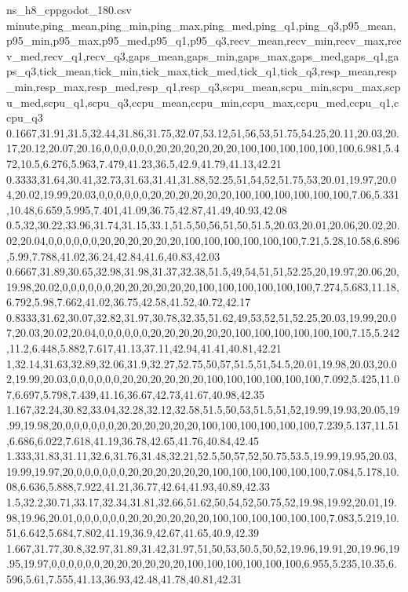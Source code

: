 \begin{filecontents*}[overwrite]{ns_h8_cppgodot_180.csv}
minute,ping_mean,ping_min,ping_max,ping_med,ping_q1,ping_q3,p95_mean,p95_min,p95_max,p95_med,p95_q1,p95_q3,recv_mean,recv_min,recv_max,recv_med,recv_q1,recv_q3,gaps_mean,gaps_min,gaps_max,gaps_med,gaps_q1,gaps_q3,tick_mean,tick_min,tick_max,tick_med,tick_q1,tick_q3,resp_mean,resp_min,resp_max,resp_med,resp_q1,resp_q3,scpu_mean,scpu_min,scpu_max,scpu_med,scpu_q1,scpu_q3,ccpu_mean,ccpu_min,ccpu_max,ccpu_med,ccpu_q1,ccpu_q3
0.1667,31.91,31.5,32.44,31.86,31.75,32.07,53.12,51,56,53,51.75,54.25,20.11,20.03,20.17,20.12,20.07,20.16,0,0,0,0,0,0,20,20,20,20,20,20,100,100,100,100,100,100,6.981,5.472,10.5,6.276,5.963,7.479,41.23,36.5,42.9,41.79,41.13,42.21
0.3333,31.64,30.41,32.73,31.63,31.41,31.88,52.25,51,54,52,51.75,53,20.01,19.97,20.04,20.02,19.99,20.03,0,0,0,0,0,0,20,20,20,20,20,20,100,100,100,100,100,100,7.06,5.331,10.48,6.659,5.995,7.401,41.09,36.75,42.87,41.49,40.93,42.08
0.5,32,30.22,33.96,31.74,31.15,33.1,51.5,50,56,51,50,51.5,20.03,20.01,20.06,20.02,20.02,20.04,0,0,0,0,0,0,20,20,20,20,20,20,100,100,100,100,100,100,7.21,5.28,10.58,6.896,5.99,7.788,41.02,36.24,42.84,41.6,40.83,42.03
0.6667,31.89,30.65,32.98,31.98,31.37,32.38,51.5,49,54,51,51,52.25,20,19.97,20.06,20,19.98,20.02,0,0,0,0,0,0,20,20,20,20,20,20,100,100,100,100,100,100,7.274,5.683,11.18,6.792,5.98,7.662,41.02,36.75,42.58,41.52,40.72,42.17
0.8333,31.62,30.07,32.82,31.97,30.78,32.35,51.62,49,53,52,51,52.25,20.03,19.99,20.07,20.03,20.02,20.04,0,0,0,0,0,0,20,20,20,20,20,20,100,100,100,100,100,100,7.15,5.242,11.2,6.448,5.882,7.617,41.13,37.11,42.94,41.41,40.81,42.21
1,32.14,31.63,32.89,32.06,31.9,32.27,52.75,50,57,51.5,51,54.5,20.01,19.98,20.03,20.02,19.99,20.03,0,0,0,0,0,0,20,20,20,20,20,20,100,100,100,100,100,100,7.092,5.425,11.07,6.697,5.798,7.439,41.16,36.67,42.73,41.67,40.98,42.35
1.167,32.24,30.82,33.04,32.28,32.12,32.58,51.5,50,53,51.5,51,52,19.99,19.93,20.05,19.99,19.98,20,0,0,0,0,0,0,20,20,20,20,20,20,100,100,100,100,100,100,7.239,5.137,11.51,6.686,6.022,7.618,41.19,36.78,42.65,41.76,40.84,42.45
1.333,31.83,31.11,32.6,31.76,31.48,32.21,52.5,50,57,52,50.75,53.5,19.99,19.95,20.03,19.99,19.97,20,0,0,0,0,0,0,20,20,20,20,20,20,100,100,100,100,100,100,7.084,5.178,10.08,6.636,5.888,7.922,41.21,36.77,42.64,41.93,40.89,42.33
1.5,32.2,30.71,33.17,32.34,31.81,32.66,51.62,50,54,52,50.75,52,19.98,19.92,20.01,19.98,19.96,20.01,0,0,0,0,0,0,20,20,20,20,20,20,100,100,100,100,100,100,7.083,5.219,10.51,6.642,5.684,7.802,41.19,36.9,42.67,41.65,40.9,42.39
1.667,31.77,30.8,32.97,31.89,31.42,31.97,51,50,53,50.5,50,52,19.96,19.91,20,19.96,19.95,19.97,0,0,0,0,0,0,20,20,20,20,20,20,100,100,100,100,100,100,6.955,5.235,10.35,6.596,5.61,7.555,41.13,36.93,42.48,41.78,40.81,42.31

\end{filecontents*}
